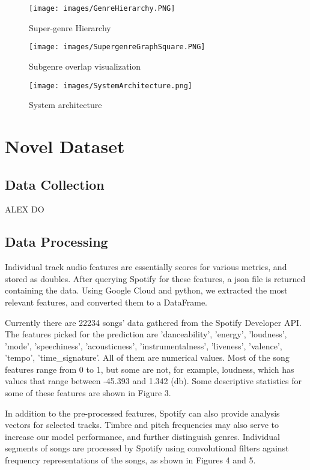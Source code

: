 \documentclass[conference]{IEEEtran}
\begin{document}
\begin{figure}[htbp]
\centerline{\texttt{[image: images/GenreHierarchy.PNG]}}
\caption{Super-genre Hierarchy}
\label{fig}
\end{figure}

\begin{figure}[htbp]
\centerline{\texttt{[image: images/SupergenreGraphSquare.PNG]}}
\caption{Subgenre overlap visualization}
\label{fig}
\end{figure}

\begin{figure*}
  \texttt{[image: images/SystemArchitecture.png]}
  \caption{System architecture}
  \label{fig}
\end{figure*}

\section{Novel Dataset}
\subsection{Data Collection}
ALEX DO

\subsection{Data Processing}
Individual track audio features are essentially scores for various metrics, and stored as doubles. After querying Spotify for these features, a json file is returned containing the data. Using Google Cloud and python, we extracted the most relevant features, and converted them to a DataFrame.

Currently there are 22234 songs’ data gathered from the Spotify Developer API. The features picked for the prediction are 'danceability', 'energy', 'loudness', 'mode', 'speechiness', 'acousticness', 'instrumentalness', 'liveness', 'valence',  'tempo', 'time\_signature'. All of them are numerical values. Most of the song features range from 0 to 1, but some are not, for example, loudness, which has values that range between -45.393 and 1.342 (db). Some descriptive statistics for some of these features are shown in Figure 3.

In addition to the pre-processed features, Spotify can also provide analysis vectors for selected tracks. Timbre and pitch frequencies may also serve to increase our model performance, and further distinguish genres. Individual segments of songs are processed by Spotify using convolutional filters against frequency representations of the songs, as shown in Figures 4 and 5. 
\end{document}
